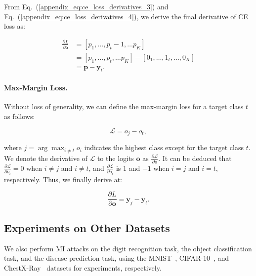 \documentclass[letterpaper]{article} %
\newcommand{\Eref}[1]{Eq.~(\ref{#1})}
\begin{document}
From \Eref{appendix_eq:ce_loss_derivatives_3} and \Eref{appendix_eq:ce_loss_derivatives_4}, we derive the final derivative of CE loss as:
\begin{linenomath*} 
\begin{equation}
\begin{aligned}
    \frac{\partial L}{\partial \mathbf{o}} &=\left[p_{1}, \dots, p_{t}-1, \dots p_{K}\right] \\
    &=\left[p_{1}, \dots ,p_{t}, \dots p_{K}\right]-\left[0_{1}, \dots ,1_{t}, \dots ,0_{K}\right] \\
    &=\mathbf{p}-\mathbf{y}_{t}.
\end{aligned}
\end{equation}
\end{linenomath*} 
\paragraph{Max-Margin Loss.}\label{appendix:MM_loss}
Without loss of generality, we can define the max-margin loss for a target class $t$ as follows:
\begin{linenomath*}
\begin{equation}
    \mathcal{L} = o_{j} - o_{t},
\end{equation}
\end{linenomath*}
where $j=\arg \max_{i \neq t}o_{i}$ indicates the highest class except for the target class $t$. We denote the derivative of $\mathcal{L}$ to the logits $\mathbf{o}$ as $\frac{\partial \mathcal{L}}{\partial \mathbf{o}}$. It can be deduced that $ \frac{\partial \mathcal{L}}{\partial o_{i}}=0$ when $i \neq j$ and $i \neq t$, and $\frac{\partial \mathcal{L}}{\partial o_{i}}$ is 1 and $-1$ when $i=j$ and $i=t$, respectively. Thus, we finally derive at:
\begin{linenomath*}
\begin{equation}
\frac{\partial L}{\partial \mathbf{o}}=\mathbf{y}_{j}-\mathbf{y}_{t}.
\end{equation}
\end{linenomath*}
	


    
\subsection{Experiments on Other Datasets}
We also perform MI attacks on the digit recognition task, the object classification task, and the disease prediction task, using the MNIST~\cite{lecun1998gradient}, CIFAR-10~\cite{krizhevsky2009learning}, and ChestX-Ray~\cite{wang2017chestx} datasets for experiments, respectively.
\end{document}

